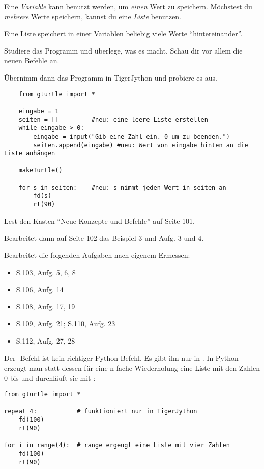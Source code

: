 \documentclass[9pt, a4paper]{arbeitsblatt}
\begin{document}
\ReiheTitel

Eine \emph{Variable} kann benutzt werden, um \emph{einen} Wert zu speichern. Möchstest du \emph{mehrere} Werte speichern, kannst du eine \emph{Liste} benutzen.

Eine Liste speichert in einer Variablen beliebig viele Werte \enquote{hintereinander}.

\begin{aufgabe}[icon=\iconBlatt\,\iconEinzel]
	Studiere das Programm und überlege, was es macht. Schau dir vor allem die neuen Befehle an.

	Übernimm dann das Programm in TigerJython und probiere es aus.
	\begin{verbatim}
	from gturtle import *

	eingabe = 1
	seiten = [] 		#neu: eine leere Liste erstellen
	while eingabe > 0:
		eingabe = input("Gib eine Zahl ein. 0 um zu beenden.")
		seiten.append(eingabe) #neu: Wert von eingabe hinten an die Liste anhängen

	makeTurtle()

	for s in seiten:	#neu: s nimmt jeden Wert in seiten an
		fd(s)
		rt(90)
	\end{verbatim}
\end{aufgabe}

\begin{aufgabe}[icon=\iconBuch\,\iconComputer\,\iconPartner]
	Lest den Kasten \enquote{Neue Konzepte und Befehle} auf Seite 101.

	Bearbeitet dann auf Seite 102 das Beispiel 3 und Aufg. 3 und 4.
\end{aufgabe}

\begin{aufgabe}[icon=\iconBuch\,\iconComputer\,\iconPartner]
	Bearbeitet die folgenden Aufgaben nach eigenem Ermessen:

	\begin{multicols}{2}
	\begin{itemize}
		\item S.103, Aufg. 5, 6, 8
		\item S.106, Aufg. 14
		\item S.108, Aufg. 17, 19
		\item S.109, Aufg. 21; S.110, Aufg. 23
		\item S.112, Aufg. 27, 28
	\end{itemize}
	\end{multicols}
\end{aufgabe}

\begin{rahmen}\small
Der -Befehl ist kein richtiger Python-Befehl. Es gibt ihn nur in . In Python erzeugt man statt dessen für eine n-fache Wiederholung eine Liste mit den Zahlen 0 bis  und durchläuft sie mit :
\begin{verbatim}
from gturtle import *

repeat 4:			# funktioniert nur in TigerJython
	fd(100)
	rt(90)

for i in range(4):	# range ergeugt eine Liste mit vier Zahlen
	fd(100)
	rt(90)
\end{verbatim}
\end{rahmen}
\end{document}
